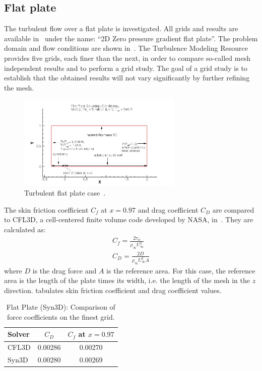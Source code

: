 \subsection{Flat plate}
The turbulent flow over a flat plate is investigated. All grids and results are available in~\cite{tmr} under the name: ``2D Zero pressure gradient flat plate''. The problem domain and flow conditions are shown in~. The Turbulence Modeling Resource provides five grids, each finer than the next, in order to compare so-called mesh independent results and to perform a grid study. The goal of a grid study is to establish that the obtained results will not vary significantly by further refining the mesh.
\begin{figure}
    \centering
    \includegraphics[width=0.7\textwidth]{figs/flat/flatplate.png}
    \caption{Turbulent flat plate case~\cite{tmr}.}
    \label{fig:flat}
\end{figure}
The skin friction coefficient $C_f$ at $x = 0.97$ and drag coefficient $C_D$ are compared to CFL3D, a cell-centered finite volume code developed by NASA, in~. They are calculated as:
\begin{align*}
    C_f = \frac{2\tau_w}{\rho_\infty U_\infty^2}\\
    C_D = \frac{2D}{\rho_\infty U_\infty^2 A}
\end{align*}
where $D$ is the drag force and $A$ is the reference area. For this case, the reference area is the length of the plate times its width, i.e. the length of the mesh in the $z$ direction.  tabulates skin friction coefficient and drag coefficient values.
\begin{table}
\centering
\caption{Flat Plate (Syn3D): Comparison of force coefficients on the finest grid.}
\label{tab:flat}
\begin{tabular}{@{}lcc@{}}
    \toprule
    Solver & $C_D$ & $C_f$ at $x=0.97$ \\
    \midrule
    CFL3D & 0.00286 & 0.00270 \\
    Syn3D & 0.00280 & 0.00269\\
    \bottomrule
\end{tabular}
\end{table}
